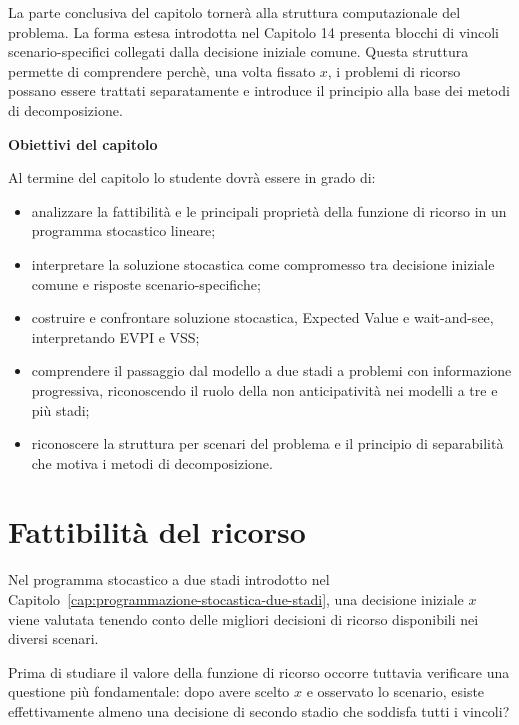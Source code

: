 La parte conclusiva del capitolo torner\`a alla struttura computazionale del
problema. La forma estesa introdotta nel Capitolo 14 presenta blocchi di
vincoli scenario-specifici collegati dalla decisione iniziale comune. Questa
struttura permette di comprendere perch\`e, una volta fissato $x$, i problemi
di ricorso possano essere trattati separatamente e introduce il principio
alla base dei metodi di decomposizione.

\medskip

\noindent
\textbf{Obiettivi del capitolo}

Al termine del capitolo lo studente dovr\`a essere in grado di:

\begin{itemize}

\item analizzare la fattibilit\`a e le principali propriet\`a della funzione
di ricorso in un programma stocastico lineare;

\item interpretare la soluzione stocastica come compromesso tra decisione
iniziale comune e risposte scenario-specifiche;

\item costruire e confrontare soluzione stocastica, Expected Value e
wait-and-see, interpretando EVPI e VSS;

\item comprendere il passaggio dal modello a due stadi a problemi con
informazione progressiva, riconoscendo il ruolo della non anticipativit\`a
nei modelli a tre e pi\`u stadi;

\item riconoscere la struttura per scenari del problema e il principio di
separabilit\`a che motiva i metodi di decomposizione.

\end{itemize}

\section{Fattibilit\`a del ricorso}

\label{sec:cap15-fattibilita-ricorso}

Nel programma stocastico a due stadi introdotto nel
Capitolo~\ref{cap:programmazione-stocastica-due-stadi}, una decisione iniziale
$x$ viene valutata tenendo conto delle migliori decisioni di ricorso
disponibili nei diversi scenari.

Prima di studiare il valore della funzione di ricorso occorre tuttavia
verificare una questione pi\`u fondamentale: dopo avere scelto $x$ e osservato
lo scenario, esiste effettivamente almeno una decisione di secondo stadio che
soddisfa tutti i vincoli?

